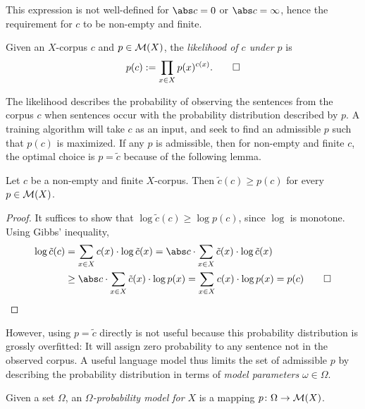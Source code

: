 This expression is not well-defined for $\abs c = 0$ or $\abs c = \infty$,
hence the requirement for $c$ to be non-empty and finite.

\begin{definition}
 Given an $X$-corpus $c$ and $p\in\mathcal M(X)$, the \emph{likelihood of $c$ under
 $p$} is
 \[
  p(c) := \prod_{x\in X} p(x)^{c(x)}. \qedhere
 \]
\end{definition}

The likelihood describes the probability of observing the sentences from the
corpus $c$ when sentences occur with the probability distribution described by
$p$. A training algorithm will take $c$ as an input, and seek to find an
admissible $p$ such that $p(c)$ is maximized. If any $p$ is admissible, then
for non-empty and finite $c$, the optimal choice is $p = \tilde c$ because of
the following lemma.

\begin{lemma}\label{lemma:empirical1}
 Let $c$ be a non-empty and finite $X$-corpus. Then $\tilde c(c) \geq p(c)$ for
 every $p\in\mathcal M(X)$.
\end{lemma}

\begin{proof}
 It suffices to show that $\log\tilde c(c) \geq \log p(c)$, since $\log$ is
 monotone. Using Gibbs' inequality,
 \begin{align*}
  \log \tilde c(c)
  &= \sum_{x\in X} c(x) \cdot \log \tilde c(x)
  = \abs c \cdot \sum_{x\in X} \tilde c(x) \cdot \log \tilde c(x) \\
  &\geq \abs c \cdot \sum_{x\in X} \tilde c(x) \cdot \log p(x)
  = \sum_{x\in X} c(x) \cdot \log p(x)
  = p(c)
  \qedhere
 \end{align*}
\end{proof}

However, using $p = \tilde c$ directly is not useful because this probability
distribution is grossly overfitted: It will assign zero probability to any
sentence not in the observed corpus. A useful language model thus limits the
set of admissible $p$ by describing the probability distribution in terms of
\emph{model parameters} $\omega\in\Omega$.

\begin{definition}
 Given a set $\Omega$, an \emph{$\Omega$-probability model for $X$} is a
 mapping $p\colon\Omega\to\mathcal M(X)$.
\end{definition}

